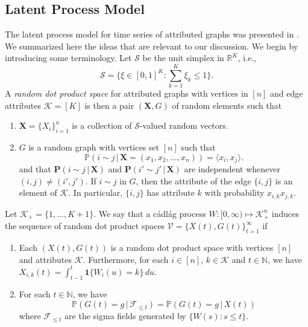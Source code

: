 \documentclass[final]{IEEEtran}
\theoremstyle{definition}
\begin{document}
\subsection{Latent Process Model}
The latent process model for time series of attributed graphs was
presented in
\cite{lee:_laten_proces_model_time_attrib_random_graph}. We summarized
here the ideas that are relevant to our discussion. We begin by
introducing some terminology. Let $\mathscr{S}$ be the unit simplex in
$\mathbb{R}^{K}$, i.e.,
\begin{equation}
  \mathscr{S} = \{ \xi \in [0,1]^{K}
  \colon \sum_{k = 1}^{K} \xi_k \leq 1 \}.
\end{equation}
A {\em random dot product space} for attributed graphs with vertices
in $[n]$ and edge attributes $\mathscr{K} = [K]
$ is then a pair $(\mathbf{X},G)$ of random elements such that
\begin{enumerate}
\item $\mathbf{X} = \{X_i\}_{i = 1}^{n}$ is a collection of
  $\mathscr{S}$-valued random vectors.
\item $G$ is a random graph with vertices set $[n]$ such that
  \begin{equation}
    \label{eq:1}
    \mathbb{P}(i \sim j \,|\, \mathbf{X} = (x_1, x_2, \dots,
    x_n)) = \langle x_i, x_j \rangle.
  \end{equation}
  and that $\mathbf{P}(i \sim j \,|\, \mathbf{X})$ and $\mathbf{P}(i' \sim
  j' \,|\, \mathbf{X})$ are independent whenever $(i,j) \not = (i',j')$. If
  $i \sim j$ in $G$, then the attribute of the edge $\{i,j\}$ is an
  element of $\mathscr{K}$. In particular, $\{i,j\}$ has attribute $k$
  with probability $x_{i,k} x_{j,k}$. 
\end{enumerate}
Let $\mathscr{K}_{+} = \{1,\dots,K+1\}$. We say that a c\'{a}dl\'{a}g
process $W \colon [0,\infty) \mapsto \mathscr{K}_{+}^{n}$ induces the
sequence of random dot product spaces $\mathscr{V} = \{X(t), G(t)\}_{t
  = 1}^{\infty}$ if
\begin{enumerate}
\item Each $(X(t), G(t))$ is a random dot product space with vertices
  $[n]$ and attributes $\mathscr{K}$. Furthermore, for each
  $i \in [n]$, $k \in \mathscr{K}$ and $t \in \mathbb{N}$, we have
  $X_{i,k}(t)  = \int_{t - 1}^{t}{ \mathbf{1}\{W_i(u) = k\}\, du}$.
\item  For each $t \in \mathbb{N}$, we have
  \begin{equation}
    \label{eq:2}
    \mathbb{P}(G(t) = g \,|\, \mathscr{F}_{\leq t}) = \mathbb{P}(G(t) = g \,|\, X(t))
  \end{equation}
where $\mathscr{F}_{\leq t}$ are the sigma fields generated by $\{W(s)
  \colon s \leq t\}$.
\end{enumerate}
\end{document}
